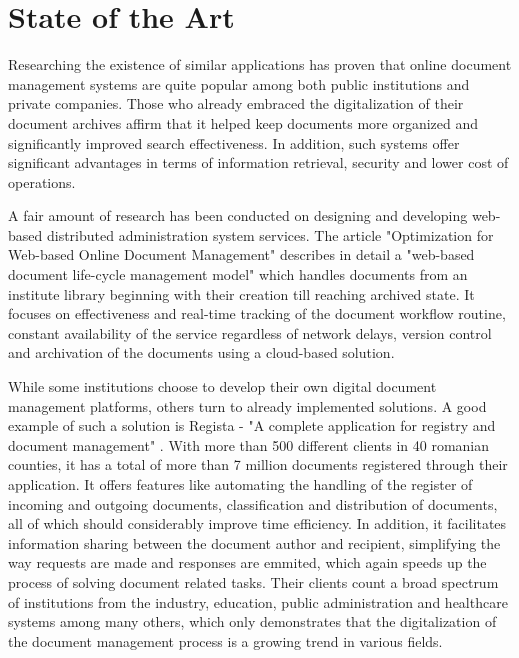\chapter{State of the Art}
\label{chapter:stateOfTheArt}

Researching the existence of similar applications has proven that online document management systems are quite popular among both public institutions and private companies. Those who already embraced the digitalization of their document archives affirm that it helped keep documents more organized and significantly improved search effectiveness. In addition, such systems offer significant advantages in terms of information retrieval, security and lower cost of operations.

A fair amount of research has been conducted on designing and developing web-based distributed administration system services. The article "Optimization for Web-based Online Document Management" \cite{Cheng-2013} describes in detail a "web-based document life-cycle management model" which handles documents from an institute library beginning with their creation till reaching archived state. It focuses on effectiveness and real-time tracking of the document workflow routine, constant availability of the service regardless of network delays, version control and archivation of the documents using a cloud-based solution.


While some institutions choose to develop their own digital document management platforms, others turn to already implemented solutions. A good example of such a solution is Regista - "A complete application for registry and document management" \cite{regista}. With more than 500 different clients in 40 romanian counties, it has a total of more than 7 million documents registered through their application. It offers features like automating the handling of the register of incoming and outgoing documents, classification and distribution of documents, all of which should considerably improve time efficiency. In addition, it facilitates information sharing between the document author and recipient, simplifying the way requests are made and responses are emmited, which again speeds up the process of solving document related tasks. Their clients count a broad spectrum of institutions from the industry, education, public administration and healthcare systems among many others, which only demonstrates that the digitalization of the document management process is a growing trend in various fields.



